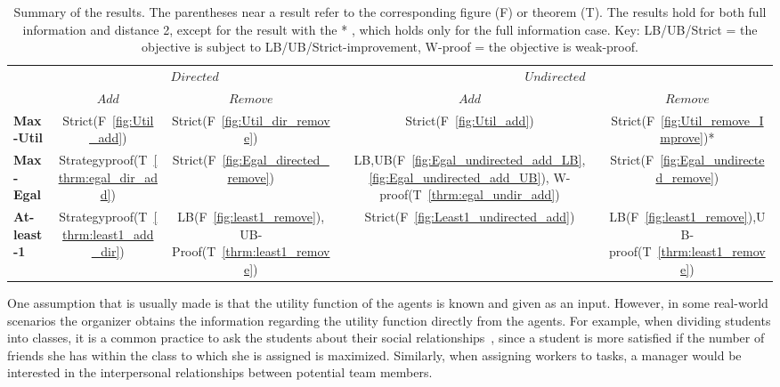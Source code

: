\documentclass{article}
\newcommand{\ra}[1]{\renewcommand{\arraystretch}{#1}}
\begin{document}
\begin{table}[t]
\centering
\ra{1}
\begin{tabular}{@{}lcccc@{}}\toprule& \multicolumn{2}{c}{$Directed$} &  \multicolumn{2}{c}{$Undirected$}\\
\cmidrule{2-3} \cmidrule{4-5}
 & $Add$ & $Remove$ & $Add$ & $Remove$\\\midrule
\textbf{Max-Util} &
Strict(F~\ref{fig:Util_add}) & Strict(F~\ref{fig:Util_dir_remove}) & Strict(F~\ref{fig:Util_add})& Strict(F~\ref{fig:Util_remove_Improve})*\\
\textbf{Max-Egal} &
Strategyproof(T~\ref{thrm:egal_dir_add})& Strict(F~\ref{fig:Egal_directed_remove}) & LB,UB(F~\ref{fig:Egal_undirected_add_LB},\ref{fig:Egal_undirected_add_UB}), W-proof(T~\ref{thrm:egal_undir_add}) & Strict(F~\ref{fig:Egal_undirected_remove})\\
\textbf{At-least-1} &
Strategyproof(T~\ref{thrm:least1_add_dir}) & LB(F~\ref{fig:least1_remove}), UB-Proof(T~\ref{thrm:least1_remove}) & Strict(F~\ref{fig:Least1_undirected_add})& LB(F~\ref{fig:least1_remove}),UB-proof(T~\ref{thrm:least1_remove})\\
\bottomrule
\end{tabular}
\caption{Summary of the results.
The parentheses near a result refer to the corresponding figure (F) or theorem (T). The results hold for both full information and distance 2, except for the result with the * , which holds only for the full information case. Key: LB/UB/Strict = the objective is subject to LB/UB/Strict-improvement, W-proof = the objective is weak-proof.
}
\label{tbl:summary}
\end{table}
One assumption that is usually made is that the utility function of the agents is known and given as an input. However, in some real-world scenarios the organizer obtains the information regarding the utility function directly from the agents. For example, when dividing students into classes, it is a common practice to ask the students about their social relationships~\cite{alonhighschool}, since a student is more satisfied if the number of friends she has within the class to which she is assigned is maximized. Similarly, when assigning workers to tasks, a manager would be interested in the interpersonal relationships between potential team members.
\end{document}
